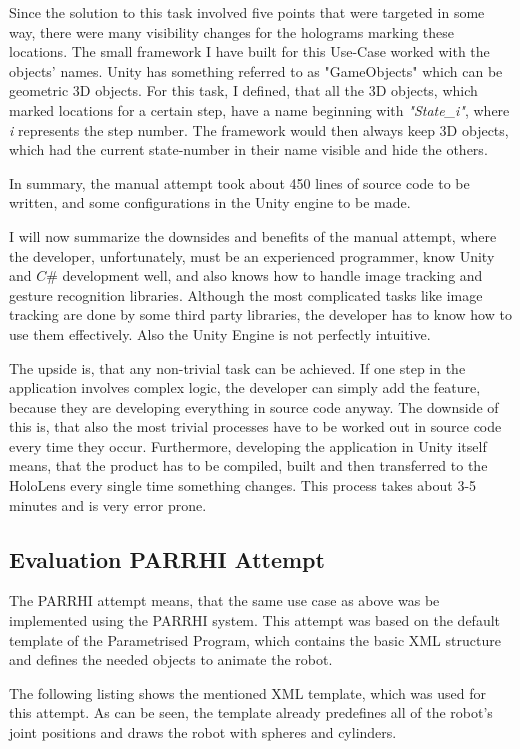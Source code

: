 Since the solution to this task involved five points that were targeted in some way, there were many visibility changes for the holograms marking these locations. The small framework I have built for this Use-Case worked with the objects' names. Unity has something referred to as "GameObjects" which can be geometric 3D objects. For this task, I defined, that all the 3D objects, which marked locations for a certain step, have a name beginning with \textit{"State\_i"}, where \textit{i} represents the step number. The framework would then always keep 3D objects, which had the current state-number in their name visible and hide the others.

In summary, the manual attempt took about 450 lines of source code to be written, and some configurations in the Unity engine to be made.

I will now summarize the downsides and benefits of the manual attempt, where the developer, unfortunately, must be an experienced programmer, know Unity and $C\#$ development well, and also knows how to handle image tracking and gesture recognition libraries. Although the most complicated tasks like image tracking are done by some third party libraries, the developer has to know how to use them effectively. Also the Unity Engine is not perfectly intuitive.

The upside is, that any non-trivial task can be achieved. If one step in the application involves complex logic, the developer can simply add the feature, because they are developing everything in source code anyway. The downside of this is, that also the most trivial processes have to be worked out in source code every time they occur. Furthermore, developing the application in Unity itself means, that the product has to be compiled, built and then transferred to the HoloLens every single time something changes. This process takes about 3-5 minutes and is very error prone.

\subsection{Evaluation PARRHI Attempt}
The PARRHI attempt means, that the same use case as above was be implemented using the PARRHI system. This attempt was based on the default template of the Parametrised Program, which contains the basic XML structure and defines the needed objects to animate the robot.

The following listing shows the mentioned XML template, which was used for this attempt. As can be seen, the template already predefines all of the robot's joint positions and draws the robot with spheres and cylinders.


